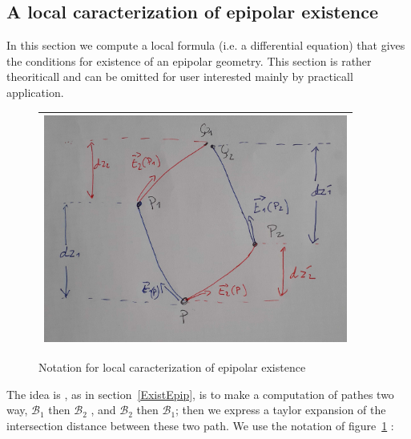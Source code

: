 \documentclass{ipol}
\newcommand{\Bund}[1]{\ensuremath{\mathcal{B}_{#1}}}
\newcommand{\BundO}{\Bund{1}}
\newcommand{\BundT}{\Bund{2}}
\begin{document}


\subsection{A local caracterization of epipolar existence}

In this section we compute a local formula (i.e. a differential equation) that gives the conditions for
existence of an epipolar geometry. This section is rather theoriticall and
can be omitted for user interested mainly by practicall application.

\begin{figure}
\centering
\begin{tabular}{||c||}
 \hline \hline
\includegraphics[width=10cm]{FIGS/EquadifEpip.jpg}
 \\ \hline \hline
\end{tabular}
\caption{Notation for local caracterization of epipolar existence}
\label{EqDifEpip}
\end{figure}

The idea is , as in section~\ref{ExistEpip}, is to make a  computation of pathes two way, $\BundO$ then $\BundT$ ,
and $\BundT$ then $\BundO$; then we express a taylor expansion of the intersection distance
between these two path.  We use the notation of figure~\ref{EqDifEpip} :
\end{document}
